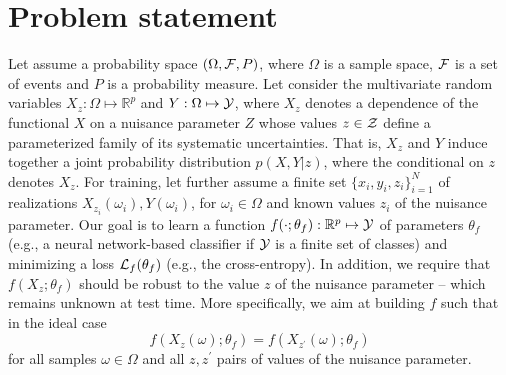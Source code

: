 \documentclass[twocolumn,superscriptaddress,aps]{revtex4-1}
\theoremstyle{plain}
\begin{document}

\section{Problem statement}
\label{sec:problem}

Let assume a probability space $(\Omega, {\cal F}, P)$, where $\Omega$ is a
sample space, ${\cal F}$ is a set of events and $P$ is a probability measure.
Let consider the multivariate random variables $X_z: \Omega \mapsto
\mathbb{R}^p$ and $Y: \Omega \mapsto {\cal Y}$, where $X_z$ denotes a dependence
of the functional $X$ on a nuisance parameter $Z$ whose values $z \in {\cal Z}$  define a
parameterized family of its systematic uncertainties. That is, $X_z$ and $Y$
induce together a joint probability distribution $p(X,Y|z)$, where the
conditional on $z$ denotes $X_z$. For training, let further assume a finite set $\{
x_i, y_i, z_i \}_{i=1}^N$ of realizations $X_{z_i}(\omega_i), Y(\omega_i)$, for
$\omega_i \in \Omega$ and known values $z_i$ of the nuisance parameter. Our goal
is to learn a function $f(\cdot;\theta_f) : \mathbb{R}^p \mapsto {\cal Y}$ of
parameters $\theta_f$ (e.g., a neural network-based classifier if ${\cal Y}$ is
a finite set of classes) and minimizing  a loss ${\cal L}_f(\theta_f)$ (e.g.,
the cross-entropy). In addition, we require that $f(X_z ; \theta_f)$ should be
robust to the value $z$ of the nuisance parameter  -- which remains unknown at
test time. More specifically, we aim at building $f$ such that in the ideal case
\begin{equation}\label{eqn:criterion-true}
f(X_{z}(\omega) ; \theta_f) = f(X_{z^\prime}(\omega) ; \theta_f)
\end{equation} for all
samples $\omega \in \Omega$ and all $z, z^\prime$ pairs of values of the
nuisance parameter.
\end{document}

